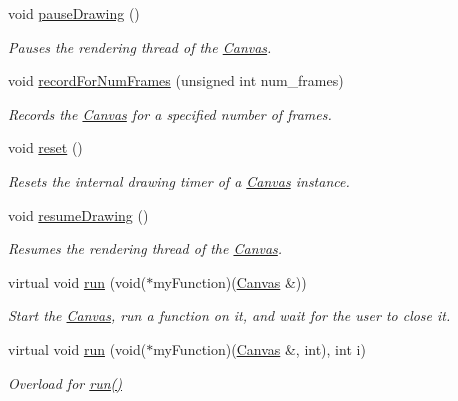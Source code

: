 \begin{DoxyCompactItemize}
void \hyperlink{classtsgl_1_1_canvas_abe021ab5148cc1327523689bced0f35a}{pause\+Drawing} ()
\begin{DoxyCompactList}\small\item\em Pauses the rendering thread of the \hyperlink{classtsgl_1_1_canvas}{Canvas}. \end{DoxyCompactList}\item 
void \hyperlink{classtsgl_1_1_canvas_a47436daa39473ddb4044bac7b3b27151}{record\+For\+Num\+Frames} (unsigned int num\+\_\+frames)
\begin{DoxyCompactList}\small\item\em Records the \hyperlink{classtsgl_1_1_canvas}{Canvas} for a specified number of frames. \end{DoxyCompactList}\item 
void \hyperlink{classtsgl_1_1_canvas_ada6403439b583910d27e497148da5f2e}{reset} ()
\begin{DoxyCompactList}\small\item\em Resets the internal drawing timer of a \hyperlink{classtsgl_1_1_canvas}{Canvas} instance. \end{DoxyCompactList}\item 
void \hyperlink{classtsgl_1_1_canvas_a56bf3c6e4eb7b06015d1c115aaa143f8}{resume\+Drawing} ()
\begin{DoxyCompactList}\small\item\em Resumes the rendering thread of the \hyperlink{classtsgl_1_1_canvas}{Canvas}. \end{DoxyCompactList}\item 
virtual void \hyperlink{classtsgl_1_1_canvas_a5f3f00d6c380a662a239077456045502}{run} (void($\ast$my\+Function)(\hyperlink{classtsgl_1_1_canvas}{Canvas} \&))
\begin{DoxyCompactList}\small\item\em Start the \hyperlink{classtsgl_1_1_canvas}{Canvas}, run a function on it, and wait for the user to close it. \end{DoxyCompactList}\item 
virtual void \hyperlink{classtsgl_1_1_canvas_a62ec8be88bea1905cdb6855138ef3cb1}{run} (void($\ast$my\+Function)(\hyperlink{classtsgl_1_1_canvas}{Canvas} \&, int), int i)
\begin{DoxyCompactList}\small\item\em Overload for \hyperlink{classtsgl_1_1_canvas_a5f3f00d6c380a662a239077456045502}{run()} \end{DoxyCompactList}\item 

\end{DoxyCompactItemize}
